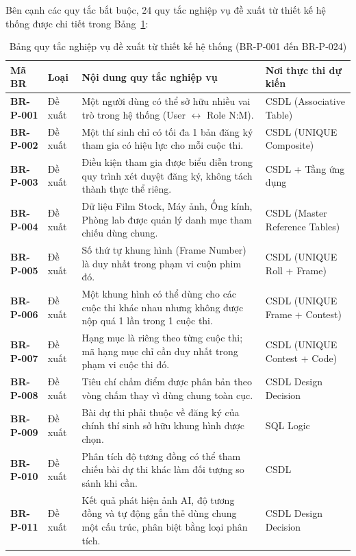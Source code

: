 Bên cạnh các quy tắc bắt buộc, 24 quy tắc nghiệp vụ đề xuất từ thiết kế hệ thống được chi tiết trong Bảng~\ref{tab:c2_br_proposed}:

\begin{table}[!ht]
\centering
\caption{Bảng quy tắc nghiệp vụ đề xuất từ thiết kế hệ thống (BR-P-001 đến BR-P-024)}
\label{tab:c2_br_proposed}
\scriptsize
\begin{tabularx}{\textwidth}{p{2.0cm}p{1.6cm}>{\raggedright\arraybackslash}Xp{3.8cm}}
\toprule
\textbf{Mã BR} & \textbf{Loại} & \textbf{Nội dung quy tắc nghiệp vụ} & \textbf{Nơi thực thi dự kiến} \\
\midrule
\textbf{BR-P-001} & Đề xuất & Một người dùng có thể sở hữu nhiều vai trò trong hệ thống (User $\leftrightarrow$ Role N:M). & CSDL (Associative Table) \\
\textbf{BR-P-002} & Đề xuất & Một thí sinh chỉ có tối đa 1 bản đăng ký tham gia có hiệu lực cho mỗi cuộc thi. & CSDL (UNIQUE Composite) \\
\textbf{BR-P-003} & Đề xuất & Điều kiện tham gia được biểu diễn trong quy trình xét duyệt đăng ký, không tách thành thực thể riêng. & CSDL + Tầng ứng dụng \\
\textbf{BR-P-004} & Đề xuất & Dữ liệu Film Stock, Máy ảnh, Ống kính, Phòng lab được quản lý danh mục tham chiếu dùng chung. & CSDL (Master Reference Tables) \\
\textbf{BR-P-005} & Đề xuất & Số thứ tự khung hình (Frame Number) là duy nhất trong phạm vi cuộn phim đó. & CSDL (UNIQUE Roll + Frame) \\
\textbf{BR-P-006} & Đề xuất & Một khung hình có thể dùng cho các cuộc thi khác nhau nhưng không được nộp quá 1 lần trong 1 cuộc thi. & CSDL (UNIQUE Frame + Contest) \\
\textbf{BR-P-007} & Đề xuất & Hạng mục là riêng theo từng cuộc thi; mã hạng mục chỉ cần duy nhất trong phạm vi cuộc thi đó. & CSDL (UNIQUE Contest + Code) \\
\textbf{BR-P-008} & Đề xuất & Tiêu chí chấm điểm được phân bản theo vòng chấm thay vì dùng chung toàn cục. & CSDL Design Decision \\
\textbf{BR-P-009} & Đề xuất & Bài dự thi phải thuộc về đăng ký của chính thí sinh sở hữu khung hình được chọn. & SQL Logic \\
\textbf{BR-P-010} & Đề xuất & Phân tích độ tương đồng có thể tham chiếu bài dự thi khác làm đối tượng so sánh khi cần. & CSDL \\
\textbf{BR-P-011} & Đề xuất & Kết quả phát hiện ảnh AI, độ tương đồng và tự động gắn thẻ dùng chung một cấu trúc, phân biệt bằng loại phân tích. & CSDL Design Decision \\

\end{tabularx}
\end{table}
